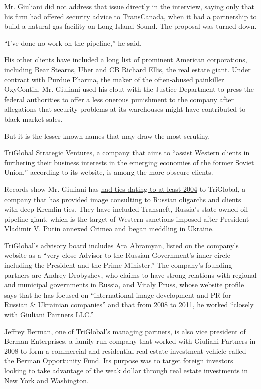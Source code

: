 Mr. Giuliani did not address that issue directly in the interview,
saying only that his firm had offered security advice to TransCanada,
when it had a partnership to build a natural-gas facility on Long Island
Sound. The proposal was turned down.

``I've done no work on the pipeline,'' he said.

His other clients have included a long list of prominent American
corporations, including Bear Stearns, Uber and CB Richard Ellis, the
real estate giant.
\href{http://www.nytimes.com/2007/12/28/us/politics/28oxycontin.html}{Under
contract with Purdue Pharma}, the maker of the often-abused painkiller
OxyContin, Mr. Giuliani used his clout with the Justice Department to
press the federal authorities to offer a less onerous punishment to the
company after allegations that security problems at its warehouses might
have contributed to black market sales.

But it is the lesser-known names that may draw the most scrutiny.

\href{http://www.tgsv.net/}{TriGlobal Strategic Ventures}, a company
that aims to ``assist Western clients in furthering their business
interests in the emerging economies of the former Soviet Union,''
according to its website, is among the more obscure clients.

Records show Mr. Giuliani has
\href{http://www.tgsv.net/management/management-team}{had ties dating to
at least 2004} to TriGlobal, a company that has provided image
consulting to Russian oligarchs and clients with deep Kremlin ties. They
have included Transneft, Russia's state-owned oil pipeline giant, which
is the target of Western sanctions imposed after President Vladimir V.
Putin annexed Crimea and began meddling in Ukraine.

TriGlobal's advisory board includes Ara Abramyan, listed on the
company's website as a ``very close Advisor to the Russian Government's
inner circle including the President and the Prime Minister.'' The
company's founding partners are Andrey Drobyshev, who claims to have
strong relations with regional and municipal governments in Russia, and
Vitaly Pruss, whose website profile says that he has focused on
``international image development and PR for Russian \& Ukrainian
companies'' and that from 2008 to 2011, he worked ``closely with
Giuliani Partners LLC.''

Jeffrey Berman, one of TriGlobal's managing partners, is also vice
president of Berman Enterprises, a family-run company that worked with
Giuliani Partners in 2008 to form a commercial and residential real
estate investment vehicle called the Berman Opportunity Fund. Its
purpose was to target foreign investors looking to take advantage of the
weak dollar through real estate investments in New York and Washington.

